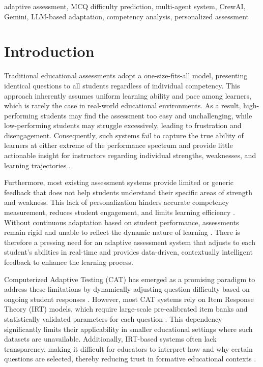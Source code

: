 \documentclass[conference]{IEEEtran}
\begin{document}
\begin{IEEEkeywords}
adaptive assessment, MCQ difficulty prediction, multi-agent system, CrewAI, Gemini, LLM-based adaptation, competency analysis, personalized assessment
\end{IEEEkeywords}

\section{Introduction}

Traditional educational assessments adopt a one-size-fits-all model, presenting identical questions to all students regardless of individual competency. This approach inherently assumes uniform learning ability and pace among learners, which is rarely the case in real-world educational environments. As a result, high-performing students may find the assessment too easy and unchallenging, while low-performing students may struggle excessively, leading to frustration and disengagement. Consequently, such systems fail to capture the true ability of learners at either extreme of the performance spectrum and provide little actionable insight for instructors regarding individual strengths, weaknesses, and learning trajectories \cite{weiss2004}.

Furthermore, most existing assessment systems provide limited or generic feedback that does not help students understand their specific areas of strength and weakness. This lack of personalization hinders accurate competency measurement, reduces student engagement, and limits learning efficiency \cite{vygotsky1978}. Without continuous adaptation based on student performance, assessments remain rigid and unable to reflect the dynamic nature of learning \cite{mislevy2003}. There is therefore a pressing need for an adaptive assessment system that adjusts to each student's abilities in real-time and provides data-driven, contextually intelligent feedback to enhance the learning process.

Computerized Adaptive Testing (CAT) has emerged as a promising paradigm to address these limitations by dynamically adjusting question difficulty based on ongoing student responses \cite{lord1980}. However, most CAT systems rely on Item Response Theory (IRT) models, which require large-scale pre-calibrated item banks and statistically validated parameters for each question \cite{lord1980}. This dependency significantly limits their applicability in smaller educational settings where such datasets are unavailable. Additionally, IRT-based systems often lack transparency, making it difficult for educators to interpret how and why certain questions are selected, thereby reducing trust in formative educational contexts \cite{hambleton1985}.
\end{document}
